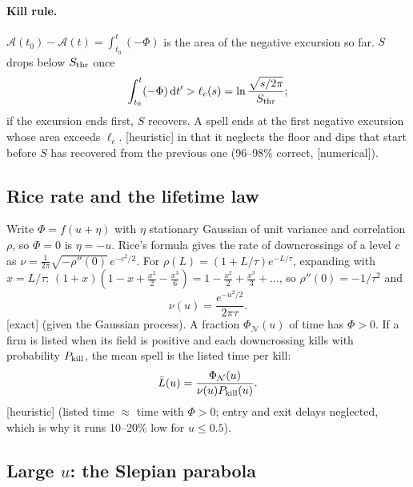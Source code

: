 \documentclass[11pt]{article}
\newcommand{\PhiN}{\Phi_{\mathcal N}}
\newcommand{\dd}{\mathrm d}
\newcommand{\exact}{\textsf{\small[exact]}}
\newcommand{\heur}{\textsf{\small[heuristic]}}
\newcommand{\numer}{\textsf{\small[numerical]}}
\begin{document}
\paragraph{Kill rule.}  $\mathcal A(t_0)-\mathcal A(t)=\int_{t_0}^t(-\Phi)$ is the area of the negative excursion so far.  $S$ drops below
$S_{\rm thr}$ once
\begin{equation}
\int_{t_0}^t(-\Phi)\,\dd t'>\ell_c(s)=\ln\frac{\sqrt{s/2\pi}}{S_{\rm thr}} ;
\end{equation}
if the excursion ends first, $S$ recovers.  A spell ends at the first negative excursion whose area exceeds $\ell_c$.
\heur{} in that it neglects the floor and dips that start before $S$ has recovered from the previous one
(96--98\% correct, \numer).

\subsection{Rice rate and the lifetime law}

Write $\Phi=f(u+\eta)$ with $\eta$ stationary Gaussian of unit variance and correlation $\rho$, so $\Phi=0$ is $\eta=-u$.  Rice's
formula gives the rate of downcrossings of a level $c$ as $\nu=\frac1{2\pi}\sqrt{-\rho''(0)}\,e^{-c^2/2}$.  For
$\rho(L)=(1+L/\tau)e^{-L/\tau}$, expanding with $x=L/\tau$: $(1+x)(1-x+\tfrac{x^2}2-\tfrac{x^3}6)=1-\tfrac{x^2}2+\tfrac{x^3}3+\dots$, so
$\rho''(0)=-1/\tau^2$ and
\begin{equation}
\nu(u)=\frac{e^{-u^2/2}}{2\pi\tau}.
\end{equation}
\exact{} (given the Gaussian process).  A fraction $\PhiN(u)$ of time has $\Phi>0$.  If a firm is listed when its field is
positive and each downcrossing kills with probability $P_{\rm kill}$, the mean spell is the listed time per kill:
\begin{equation}
\bar L(u)=\frac{\PhiN(u)}{\nu(u)P_{\rm kill}(u)} .
\end{equation}
\heur{} (listed time $\approx$ time with $\Phi>0$; entry and exit delays neglected, which is why it runs 10--20\% low for $u\le0.5$).

\subsection{Large $u$: the Slepian parabola}
\end{document}
